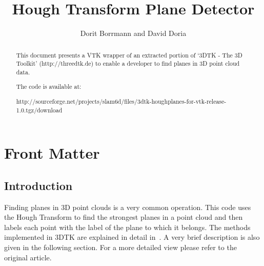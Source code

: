\documentclass{InsightArticle}
\title{Hough Transform Plane Detector}
\author{Dorit Borrmann and David Doria}
\newcommand{\IJhandlerIDnumber}{3290}
\begin{document}
\IJhandlefooter{\IJhandlerIDnumber}


\ifpdf
\else
\fi


\maketitle


\ifhtml
\chapter*{Front Matter\label{front}}
\fi

\begin{abstract}
\noindent
This document presents a VTK wrapper of an extracted portion of `3DTK - The 3D Toolkit' (http://threedtk.de) to enable a developer to find planes in 3D point cloud data.

\vspace{14pt}

\noindent The code is available at:

\noindent
http://sourceforge.net/projects/slam6d/files/3dtk-houghplanes-for-vtk-release-1.0.tgz/download

\end{abstract}

\IJhandlenote{\IJhandlerIDnumber}

\tableofcontents

\section{Introduction}
Finding planes in 3D point clouds is a very common operation. This code uses the
Hough Transform to find the strongest planes in a point cloud and then labels
each point with the label of the plane to which it belongs. The methods
implemented in 3DTK are explained in detail in~\cite{Borrmann:2011}. A very
brief description is also given in the following section. For a more detailed view please refer to
the original article.
\end{document}
